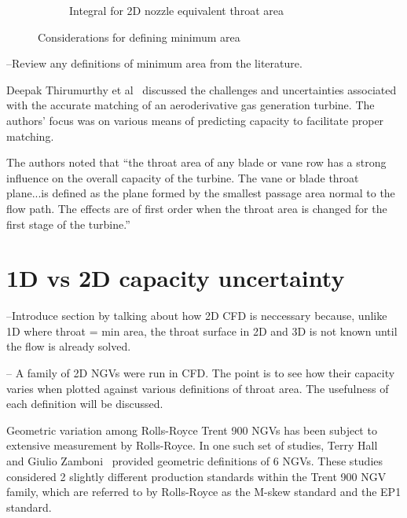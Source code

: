 \documentclass[a4paper, 11pt, twoside]{report}
\begin{document}
\begin{figure}[H]
\begin{subfigure}{.45\textwidth}
		\caption{Integral for 2D nozzle equivalent throat area}
		\label{fig:illustration_of_equivalent_throat_area_integral}
	\end{subfigure}
	\caption{Considerations for defining minimum area}
\end{figure}
 		
 --Review any definitions of minimum area from the literature.
 
Deepak Thirumurthy et al~\cite{thirumurthy_throat_area} discussed the challenges and uncertainties associated with the accurate matching of an aeroderivative gas generation turbine. The authors' focus was on various means of predicting capacity to facilitate proper matching. 

The authors noted that ``the throat area of any blade or vane row has a strong influence on the overall capacity of the turbine. The vane or blade throat plane...is defined as the plane formed by the smallest passage area normal to the flow path. The effects are of first order when the throat area is changed for the first stage of the turbine.''


\section{1D vs 2D capacity uncertainty}
\label{section_1d_vs_2d_capacity_uncertainty}

--Introduce section by talking about how 2D CFD is neccessary because, unlike 1D where throat = min area, the throat surface in 2D and 3D is not known until the flow is already solved.

-- A family of 2D NGVs were run in CFD. The point is to see how their capacity varies when plotted against various definitions of throat area. The usefulness of each definition will be discussed.

Geometric variation among Rolls-Royce Trent 900 NGVs has been subject to extensive measurement by Rolls-Royce. In one such set of studies, Terry Hall~\cite{hall_area} and Giulio Zamboni~\cite{zamboni_area} provided geometric definitions of 6 NGVs. These studies considered 2 slightly different production standards within the Trent 900 NGV family, which are referred to by Rolls-Royce as the M-skew standard and the EP1 standard.
\end{document}
